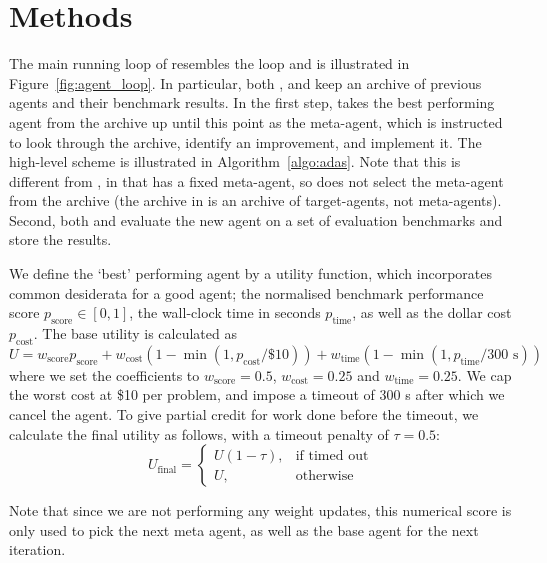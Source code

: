\section{Methods}
\label{sec:methods}

The main running loop of  resembles the
 loop \citet{huAutomatedDesignAgentic2024} and is illustrated in
Figure~\ref{fig:agent_loop}.
In particular, both , and  keep an archive of previous agents and their benchmark results.
In the first step,  takes the best performing agent from the archive up until this point as the meta-agent, which is instructed to
look through the archive, identify an improvement, and implement it. The
high-level scheme is illustrated in Algorithm~\ref{algo:adas}.
Note that this is different from , in that  has a fixed meta-agent, so does not select the meta-agent from the archive (the archive in  is an archive of target-agents, not meta-agents).
Second, both  and  evaluate the new agent on a set of evaluation benchmarks and store the results.

We define the `best' performing agent by a utility
function, which incorporates common desiderata for a good agent; the normalised
benchmark performance score $p_{\text{score}} \in [0, 1]$, the wall-clock time
in seconds $p_{\text{time}}$, as well as the dollar cost $p_{\text{cost}}$. The
base utility is calculated as
\begin{equation}
\label{eq:base_utility}
U = w_{\text{score}} p_{\text{score}} + w_{\text{cost}} (1 - \min(1, p_{\text{cost}} / \$ 10)) + w_{\text{time}} (1 - \min(1, p_{\text{time}} / 300 \text{ s}))
\end{equation}
where we set the coefficients to $w_{\text{score}} = 0.5$,
$w_{\text{cost}} = 0.25$ and $w_{\text{time}} = 0.25$.
We cap the worst cost at
\$10 per problem, and impose a timeout of 300 s after which we cancel the agent.
To give partial credit for work done before the timeout, we calculate the final
utility as follows, with a timeout penalty of $\tau = 0.5$:
\begin{equation}
U_{\text{final}} =
\begin{cases}
    U (1 - \tau), & \text{if timed out} \\
    U, & \text{otherwise}
\end{cases}
\end{equation}

Note that since we are not performing any weight updates, this numerical score
is only used to pick the next meta agent, as well as the base agent for the next
iteration.

